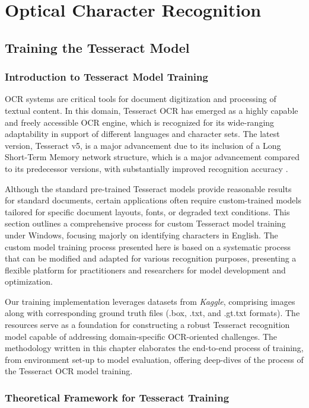 \chapter{Optical  Character Recognition}


\section{Training the Tesseract Model}

\subsection{Introduction to Tesseract Model Training}

OCR systems are critical tools for document digitization and processing of textual content. In this domain, Tesseract OCR has emerged as a highly capable and freely accessible OCR engine, which is recognized for its wide-ranging adaptability in support of different languages and character sets. The latest version, Tesseract v5, is a major advancement due to its inclusion of a Long Short-Term Memory network structure, which is a major advancement compared to its predecessor versions, with substantially improved recognition accuracy \cite{smith2007overview}.

Although the standard pre-trained Tesseract models provide reasonable results for standard documents, certain applications often require custom-trained models tailored for specific document layouts, fonts, or degraded text conditions. This section outlines a comprehensive process for custom Tesseract model training under Windows, focusing majorly on identifying characters in English. The custom model training process presented here is based on a systematic process that can be modified and adapted for various recognition purposes,  presenting a flexible platform for practitioners and researchers for model development and optimization.

Our training implementation leverages datasets from \textit{Kaggle}, comprising images along with corresponding ground truth files (.box, .txt, and .gt.txt formats). The resources serve as a foundation for constructing a robust Tesseract recognition model capable of addressing domain-specific OCR-oriented challenges. The methodology written in this chapter elaborates the end-to-end process of training,  from environment set-up to model evaluation, offering deep-dives of the process of the Tesseract OCR model training.

\subsection{Theoretical Framework for Tesseract Training}

